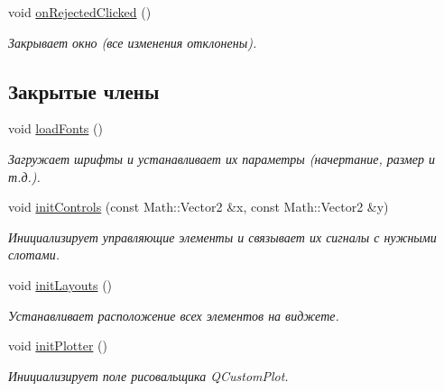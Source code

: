 \begin{DoxyCompactItemize}
\hypertarget{class_ranges_dialog_a468a5018e8cce506affa2113b1e620e3}{}\label{class_ranges_dialog_a468a5018e8cce506affa2113b1e620e3} 
void \hyperlink{class_ranges_dialog_a468a5018e8cce506affa2113b1e620e3}{on\+Rejected\+Clicked} ()
\begin{DoxyCompactList}\small\item\em Закрывает окно (все изменения отклонены). \end{DoxyCompactList}\end{DoxyCompactItemize}
\subsection*{Закрытые члены}
\begin{DoxyCompactItemize}
\item 
void \hyperlink{class_ranges_dialog_ad57f53fe1a4c87c825f02154b539c10c}{load\+Fonts} ()
\begin{DoxyCompactList}\small\item\em Загружает шрифты и устанавливает их параметры (начертание, размер и т.\+д.). \end{DoxyCompactList}\item 
void \hyperlink{class_ranges_dialog_aa05dcc5245ec5014e71866acdfc81de1}{init\+Controls} (const Math\+::\+Vector2 \&x, const Math\+::\+Vector2 \&y)
\begin{DoxyCompactList}\small\item\em Инициализирует управляющие элементы и связывает их сигналы с нужными слотами. \end{DoxyCompactList}\item 
\hypertarget{class_ranges_dialog_abd72fb84fe9762c5b3a53811fc3dde91}{}\label{class_ranges_dialog_abd72fb84fe9762c5b3a53811fc3dde91} 
void \hyperlink{class_ranges_dialog_abd72fb84fe9762c5b3a53811fc3dde91}{init\+Layouts} ()
\begin{DoxyCompactList}\small\item\em Устанавливает расположение всех элементов на виджете. \end{DoxyCompactList}\item 
\hypertarget{class_ranges_dialog_a12f1da38b72c0a1005145f56e9160ba6}{}\label{class_ranges_dialog_a12f1da38b72c0a1005145f56e9160ba6} 
void \hyperlink{class_ranges_dialog_a12f1da38b72c0a1005145f56e9160ba6}{init\+Plotter} ()
\begin{DoxyCompactList}\small\item\em Инициализирует поле рисовальщика Q\+Custom\+Plot. \end{DoxyCompactList}\end{DoxyCompactItemize}
